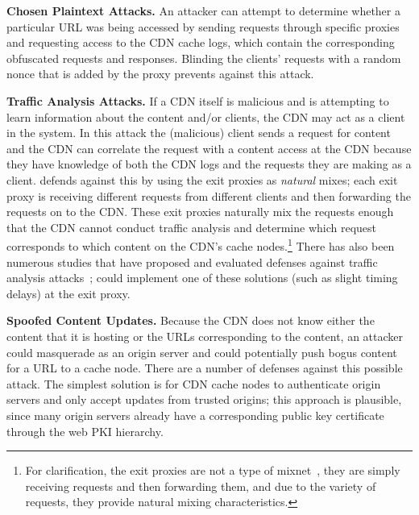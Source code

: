\textbf{Chosen Plaintext Attacks.} An attacker can attempt to
determine whether a particular URL was being accessed by sending requests
through specific \system{} proxies and requesting access to the CDN cache logs, 
which contain the corresponding obfuscated
requests and responses. Blinding the clients' requests
with a random nonce that is added by the proxy prevents against this
attack. %

\textbf{Traffic Analysis Attacks.} If a CDN itself is malicious and is attempting 
to learn information about the content and/or clients, the CDN may act as a client 
in the system.  In this attack the (malicious) client sends a request for content 
and the CDN can correlate the request with a content access at the CDN because they have 
knowledge of both the CDN logs and the requests they are making as a client.  \system{} 
defends against this by using the exit proxies as {\it natural} mixes; each exit proxy is receiving 
different requests from different clients and then forwarding the requests on to the CDN.  
These exit proxies naturally mix the requests enough that the CDN cannot conduct traffic analysis
 and determine which request corresponds to which content on the CDN's cache nodes.\footnote{For clarification, the exit proxies 
are not a type of mixnet~\cite{chaum1981untraceable}, they are simply receiving requests and then forwarding them, and due to the variety of 
requests, they provide natural mixing characteristics.}  There has 
also been numerous studies that have proposed and evaluated defenses against traffic 
analysis attacks~\cite{wright2009traffic,rackoff1993cryptographic}; \system{} could implement one of these solutions (such as slight timing delays) at the exit 
proxy.

\textbf{Spoofed Content Updates.} Because the CDN does not know either the content that it is hosting or the URLs
corresponding to the content, an attacker could masquerade as an origin server
and could potentially push bogus content for a URL to a cache node. There are
a number of defenses against this possible attack. The simplest solution is
for CDN cache nodes to authenticate origin servers and only accept updates
from trusted origins; this approach is plausible, since many origin servers already
have a corresponding public key certificate through the web PKI hierarchy.  %

